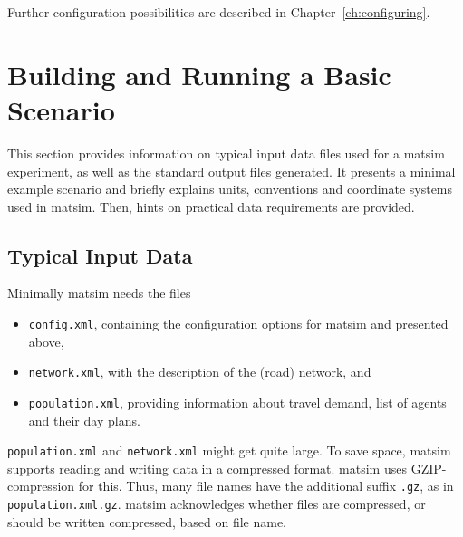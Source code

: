 Further configuration possibilities are described in Chapter~\ref{ch:configuring}.

\section{Building and Running a Basic Scenario}
\label{sec:buildingbasicscenario}
This section provides information on typical input data files used for a \gls{matsim} experiment, as well as the standard output files generated. It presents a minimal example scenario and briefly explains units, conventions and coordinate systems used in \gls{matsim}. Then, hints on practical data requirements
are provided.

\subsection{Typical Input Data}
\label{sec:inputdata}
Minimally \gls{matsim} needs the files
\begin{itemize}\styleItemize
	\item \lstinline|config.xml|, containing the configuration options for \gls{matsim} and presented above,
	\item \lstinline|network.xml|, with the description of the (road) network, and
	\item \lstinline|population.xml|, providing information about travel demand, \ie list of agents and their day plans.
\end{itemize}


\lstinline|population.xml| and \lstinline|network.xml| 
might get quite large. To save space, \gls{matsim} supports reading and writing data in a compressed format. \gls{matsim} uses GZIP-compression for this. Thus, many file names have the additional suffix \lstinline|.gz|, as in \lstinline|population.xml.gz|. \gls{matsim} acknowledges whether files are compressed, or should be written compressed, based on file name.

